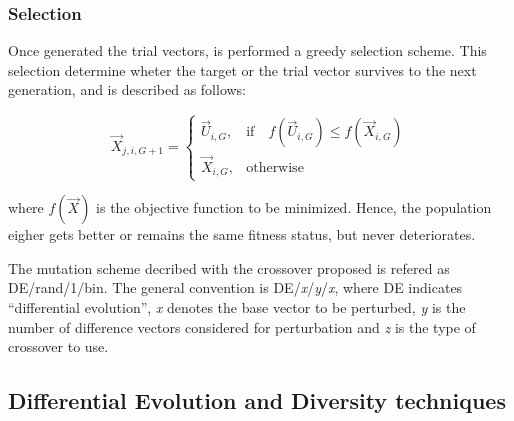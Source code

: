 \subsubsection{Selection}
Once generated the trial vectors, is performed a greedy selection scheme.
%
This selection determine wheter the target or the trial vector survives to the next generation, and is described as follows:

\begin{equation} \label{eqn:selection}
\vec{X}_{j,i,G+1}= 
\begin{cases}
    \vec{U}_{i,G},& \text{if} \quad f(\vec{U}_{i,G}) \leq f(\vec{X}_{i,G})  \\
    \vec{X}_{i,G},              & \text{otherwise}
\end{cases}
\end{equation}

where $f(\vec{X})$ is the objective function to be minimized.
%
Hence, the population eigher gets better or remains the same fitness status, but never deteriorates.

The mutation scheme decribed with the crossover proposed is refered as DE/rand/1/bin.
%
The general convention is DE/\textit{x}/\textit{y}/\textit{x}, where DE indicates ``differential evolution'', \textit{x} denotes the base vector to be perturbed, \textit{y} is the number of difference vectors considered for perturbation and \textit{z} is the type of crossover to use.

\subsection{Differential Evolution and Diversity techniques}


